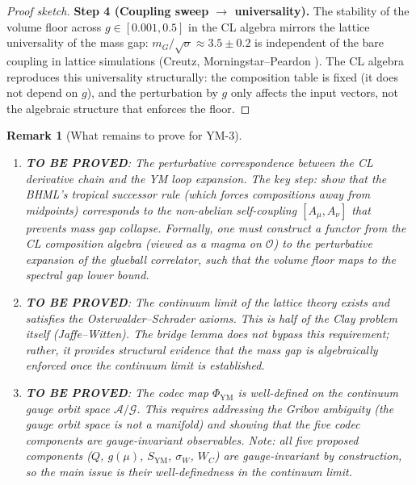 \documentclass[11pt]{article}
\newtheorem{remark}[lemma]{Remark}
\theoremstyle{definition}
\begin{document}
\begin{proof}[Proof sketch]
\medskip
\textbf{Step 4 (Coupling sweep $\to$ universality).}
The stability of the volume floor across $g \in [0.001, 0.5]$ in the
CL algebra mirrors the lattice universality of the mass gap:
$m_G/\sqrt{\sigma} \approx 3.5 \pm 0.2$ is independent of the bare
coupling in lattice simulations (Creutz, Morningstar--Peardon \cite{Creutz}).
The CL algebra reproduces this universality structurally: the composition
table is fixed (it does not depend on $g$), and the perturbation by $g$
only affects the input vectors, not the algebraic structure that enforces
the floor.
\end{proof}

\begin{remark}[What remains to prove for YM-3]
\label{rem:ym3-gaps}
\begin{enumerate}
  \item \textbf{TO BE PROVED}: The perturbative correspondence between the
    CL derivative chain and the YM loop expansion.
    The key step: show that the BHML's tropical successor rule
    (which forces compositions away from midpoints) corresponds to the
    non-abelian self-coupling $[A_\mu, A_\nu]$ that prevents mass gap collapse.
    Formally, one must construct a functor from the CL composition algebra
    (viewed as a magma on $\mathcal{O}$) to the perturbative expansion
    of the glueball correlator, such that the volume floor maps to the
    spectral gap lower bound.

  \item \textbf{TO BE PROVED}: The continuum limit of the lattice theory
    exists and satisfies the Osterwalder--Schrader axioms.
    This is half of the Clay problem itself (Jaffe--Witten).
    The bridge lemma does not bypass this requirement; rather, it provides
    structural evidence that the mass gap is algebraically enforced
    \emph{once} the continuum limit is established.

  \item \textbf{TO BE PROVED}: The codec map $\Phi_{\mathrm{YM}}$ is well-defined
    on the continuum gauge orbit space $\mathcal{A}/\mathcal{G}$.
    This requires addressing the Gribov ambiguity (the gauge orbit space
    is not a manifold) and showing that the five codec components are
    gauge-invariant observables.
    Note: all five proposed components ($Q$, $g(\mu)$, $S_{\mathrm{YM}}$,
    $\sigma_W$, $W_C$) are gauge-invariant by construction, so the
    main issue is their well-definedness in the continuum limit.
\end{enumerate}
\end{remark}
\end{document}
